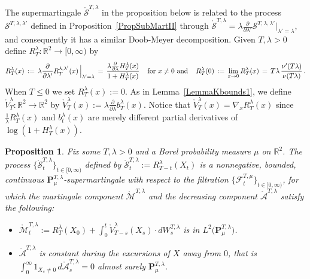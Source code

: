\documentclass[10pt]{article}
\numberwithin{equation}{section}
\newtheorem{proposition}[theorem]{Proposition}
\theoremstyle{definition}
\newcommand{\R}{{\mathbb R}}
\begin{document}
The supermartingale $\mathring{\mathcal{S}}^{T,\lambda}$  in the proposition below  is related to the process $\mathcal{S}^{T,\lambda,\lambda'}$ defined in Proposition~\ref{PropSubMartII} through $ \mathring{\mathcal{S}}^{T,\lambda}=  \lambda\frac{ 
\partial }{ \partial \lambda' }\mathcal{S}^{T,\lambda,\lambda'}|_{\lambda'=\lambda}$, and consequently  it has a  similar Doob-Meyer decomposition. Given $T,\lambda>0$ define  $R^{\lambda}_T:\R^2\rightarrow [0,\infty)$ by 
\begin{align}\label{RThing}
R^{\lambda}_T(x) \, :=\, \lambda\frac{\partial }{\partial \lambda'}  R^{\lambda,\lambda'}_T(x) \,\Big|_{\lambda'=\lambda}  \,  = \,\frac{\lambda \frac{\partial}{\partial \lambda} H_{T}^{\lambda}( x) }{1+H_{T}^{\lambda}( x)  } \hspace{.4cm}\text{for $x\neq 0$ and}\hspace{.4cm} R^{\lambda}_{T}(0)\,:=\,\lim_{x\rightarrow 0} R^{\lambda}_{T}(x)   \,=\,T\lambda\, \frac{ \nu'( T\lambda  )   }{ \nu( T\lambda  )   }  \,. 
\end{align}
 When $T\leq 0$ we set $R^{\lambda}_T(x):=0$.   As in  Lemma~\ref{LemmaKbounds1}, we define  $ \mathring{V}_{T}^{\lambda}:\R^2\rightarrow \R^2 $ by $\mathring{V}_{T}^{ \lambda }(x):=\lambda \frac{\partial}{\partial \lambda}b_T^{\lambda}(x)$.  Notice that  $\mathring{V}_{T}^{ \lambda }(x)= \nabla_x R^{\lambda}_{T}(x)$ since $\frac{1}{\lambda}R^{\lambda}_{T}(x)$ and $b_t^{\lambda}(x)$ are merely different partial derivatives of $\log(1+H_T^{\lambda}(x))$. 

 
\begin{proposition}\label{PropSubMartIII} Fix some  $T,\lambda >0$  and a Borel probability measure  $\mu$  on $ \R^2$.   The process $\{\mathring{\mathcal{S}}_{t}^{T,\lambda}\}_{t\in [0,\infty)}$ defined by $\mathring{\mathcal{S}}_{t}^{T,\lambda}:=R^{\lambda}_{T-t}( X_t)  $ is a  nonnegative, bounded, continuous $\mathbf{P}^{T,\lambda}_{\mu}$-supermartingale with respect to the filtration $\{\mathscr{F}_t^{T,\mu   }\}_{t\in [0,\infty)}$, for which the martingale component $\mathring{\mathcal{M}}^{T,\lambda}$ and the decreasing component $\mathring{\mathcal{A}}^{T,\lambda}$ satisfy the following:

\begin{itemize}
    \item $\mathring{\mathcal{M}}_{t  }^{T,\lambda}:=R^{\lambda}_{T}(X_0)   +\int_0^t\mathring{V}_{T-s }^{\lambda}(X_s)
\cdot dW_{s}^{T,\lambda} $ is in $L^2\big(\mathbf{P}^{T,\lambda}_{\mu}\big)$.


    \item $\mathring{\mathcal{A}}^{T,\lambda}$  is constant during the excursions of $X$ away from $0$, that is $\int_0^{\infty}1_{X_s\neq 0 }\, d\mathring{\mathcal{A}}^{T,\lambda}_s=0 $ almost surely $\mathbf{P}^{T,\lambda}_{\mu}$.
    
\end{itemize}

\end{proposition}
\end{document}

